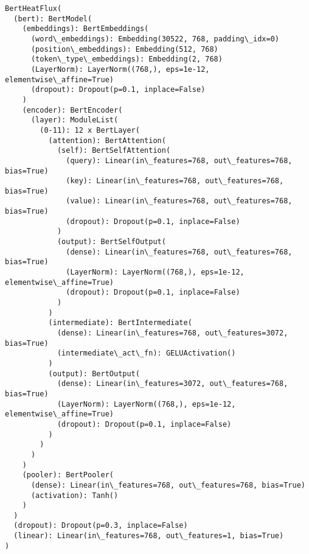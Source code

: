 \documentclass[11pt]{article}
\makeatletter
\newcommand{\boxspacing}{\kern\kvtcb@left@rule\kern\kvtcb@boxsep}
\newcommand{\prompt}[4]{
        {\ttfamily\llap{{\color{#2}[#3]:\hspace{3pt}#4}}\vspace{-\baselineskip}}
    }
\makeatother
\begin{document}
            \begin{tcolorbox}[breakable, size=fbox, boxrule=.5pt, pad at break*=1mm, opacityfill=0]
\prompt{Out}{outcolor}{3}{\boxspacing}
\begin{Verbatim}[commandchars=\\\{\}]
BertHeatFlux(
  (bert): BertModel(
    (embeddings): BertEmbeddings(
      (word\_embeddings): Embedding(30522, 768, padding\_idx=0)
      (position\_embeddings): Embedding(512, 768)
      (token\_type\_embeddings): Embedding(2, 768)
      (LayerNorm): LayerNorm((768,), eps=1e-12, elementwise\_affine=True)
      (dropout): Dropout(p=0.1, inplace=False)
    )
    (encoder): BertEncoder(
      (layer): ModuleList(
        (0-11): 12 x BertLayer(
          (attention): BertAttention(
            (self): BertSelfAttention(
              (query): Linear(in\_features=768, out\_features=768, bias=True)
              (key): Linear(in\_features=768, out\_features=768, bias=True)
              (value): Linear(in\_features=768, out\_features=768, bias=True)
              (dropout): Dropout(p=0.1, inplace=False)
            )
            (output): BertSelfOutput(
              (dense): Linear(in\_features=768, out\_features=768, bias=True)
              (LayerNorm): LayerNorm((768,), eps=1e-12, elementwise\_affine=True)
              (dropout): Dropout(p=0.1, inplace=False)
            )
          )
          (intermediate): BertIntermediate(
            (dense): Linear(in\_features=768, out\_features=3072, bias=True)
            (intermediate\_act\_fn): GELUActivation()
          )
          (output): BertOutput(
            (dense): Linear(in\_features=3072, out\_features=768, bias=True)
            (LayerNorm): LayerNorm((768,), eps=1e-12, elementwise\_affine=True)
            (dropout): Dropout(p=0.1, inplace=False)
          )
        )
      )
    )
    (pooler): BertPooler(
      (dense): Linear(in\_features=768, out\_features=768, bias=True)
      (activation): Tanh()
    )
  )
  (dropout): Dropout(p=0.3, inplace=False)
  (linear): Linear(in\_features=768, out\_features=1, bias=True)
)
\end{Verbatim}
\end{tcolorbox}
        
\end{document}
